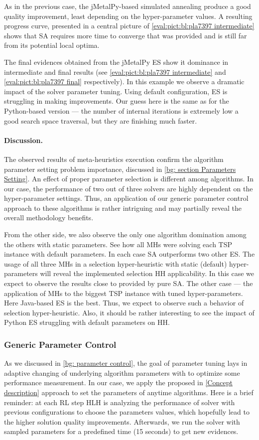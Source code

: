 As in the previous case, the jMetalPy-based simulated annealing produce a good quality improvement, least depending on the hyper-parameter values. A resulting progress curve, presented in a central picture of \cref{eval:pict:bl:pla7397 intermediate} shows that SA requires more time to converge that was provided and is still far from its potential local optima.

The final evidences obtained from the jMetalPy ES show it dominance in intermediate and final results (see \cref{eval:pict:bl:pla7397 intermediate} and \cref{eval:pict:bl:pla7397 final} respectively). In this example we observe a dramatic impact of the solver parameter tuning. Using default configuration, ES is struggling in making improvements. Our guess here is the same as for the Python-based version — the number of internal iterations is extremely low a good search space traversal, but they are finishing much faster.


\paragraph{Discussion.} The observed results of meta-heuristics execution confirm the algorithm parameter setting problem importance, discussed in \cref{bg: section Parameters Setting}. An effect of proper parameter selection is different among algorithms. In our case, the performance of two out of three solvers are highly dependent on the hyper-parameter settings. Thus, an application of our generic parameter control approach to these algorithms is rather intriguing and may partially reveal the overall methodology benefits.

From the other side, we also observe the only one algorithm domination among the others with static parameters. See how all MHs were solving each TSP instance with default parameters. In each case SA outperforms two other ES. The usage of all three MHs in a selection hyper-heuristic with static (default) hyper-parameters will reveal the implemented selection HH applicability. In this case we expect to observe the results close to provided by pure SA. The other case — the application of MHs to the biggest TSP instance with tuned hyper-parameters. Here Java-based ES is the best. Thus, we expect to observe such a behavior of selection hyper-heuristic. Also, it should be rather interesting to see the impact of Python ES struggling with default parameters on HH.

\subsubsection{Generic Parameter Control}
As we discussed in \cref{bg: parameter control}, the goal of parameter tuning lays in adaptive changing of underlying algorithm parameters with to optimize some performance measurement. In our case, we apply the proposed in \cref{Concept description} approach to set the parameters of anytime algorithms. Here is a brief reminder: at each RL step HLH is analyzing the performance of solver with previous configurations to choose the parameters values, which hopefully lead to the higher solution quality improvements. Afterwards, we run the solver with sampled parameters for a predefined time (15 seconds) to get new evidences. 

